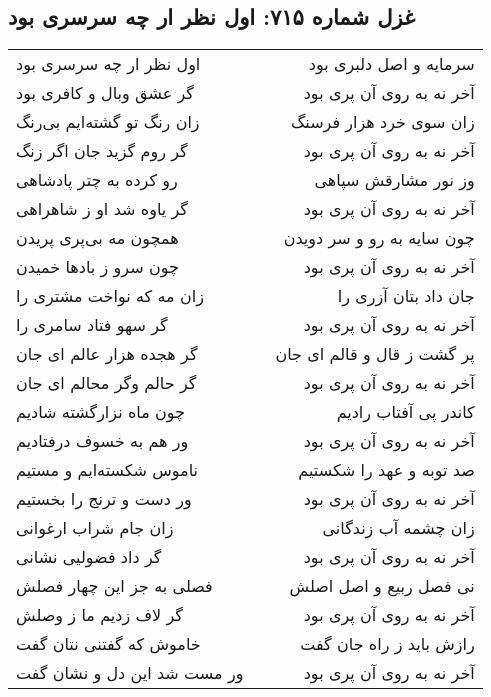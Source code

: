 \begin{center}
\section*{غزل شماره ۷۱۵: اول نظر ار چه سرسری بود}
\label{sec:0715}
\begin{longtable}{l p{0.5cm} r}
اول نظر ار چه سرسری بود
&&
سرمایه و اصل دلبری بود
\\
گر عشق وبال و کافری بود
&&
آخر نه به روی آن پری بود
\\
زان رنگ تو گشته‌ایم بی‌رنگ
&&
زان سوی خرد هزار فرسنگ
\\
گر روم گزید جان اگر زنگ
&&
آخر نه به روی آن پری بود
\\
رو کرده به چتر پادشاهی
&&
وز نور مشارقش سپاهی
\\
گر یاوه شد او ز شاهراهی
&&
آخر نه به روی آن پری بود
\\
همچون مه بی‌پری پریدن
&&
چون سایه به رو و سر دویدن
\\
چون سرو ز بادها خمیدن
&&
آخر نه به روی آن پری بود
\\
زان مه که نواخت مشتری را
&&
جان داد بتان آزری را
\\
گر سهو فتاد سامری را
&&
آخر نه به روی آن پری بود
\\
گر هجده هزار عالم ای جان
&&
پر گشت ز قال و قالم ای جان
\\
گر حالم وگر محالم ای جان
&&
آخر نه به روی آن پری بود
\\
چون ماه نزارگشته شادیم
&&
کاندر پی آفتاب رادیم
\\
ور هم به خسوف درفتادیم
&&
آخر نه به روی آن پری بود
\\
ناموس شکسته‌ایم و مستیم
&&
صد توبه و عهد را شکستیم
\\
ور دست و ترنج را بخستیم
&&
آخر نه به روی آن پری بود
\\
زان جام شراب ارغوانی
&&
زان چشمه آب زندگانی
\\
گر داد فضولیی نشانی
&&
آخر نه به روی آن پری بود
\\
فصلی به جز این چهار فصلش
&&
نی فصل ربیع و اصل اصلش
\\
گر لاف زدیم ما ز وصلش
&&
آخر نه به روی آن پری بود
\\
خاموش که گفتنی نتان گفت
&&
رازش باید ز راه جان گفت
\\
ور مست شد این دل و نشان گفت
&&
آخر نه به روی آن پری بود
\\
\end{longtable}
\end{center}
